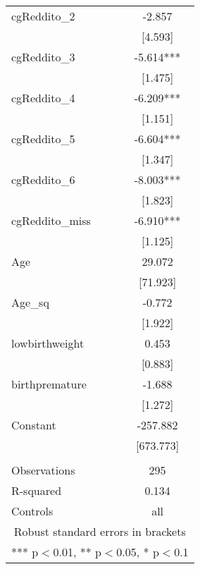 \documentclass[]{article}
\begin{document}
\begin{tabular}{lc}
cgReddito\_2 & -2.857 \\
 & [4.593] \\
cgReddito\_3 & -5.614*** \\
 & [1.475] \\
cgReddito\_4 & -6.209*** \\
 & [1.151] \\
cgReddito\_5 & -6.604*** \\
 & [1.347] \\
cgReddito\_6 & -8.003*** \\
 & [1.823] \\
cgReddito\_miss & -6.910*** \\
 & [1.125] \\
Age & 29.072 \\
 & [71.923] \\
Age\_sq & -0.772 \\
 & [1.922] \\
lowbirthweight & 0.453 \\
 & [0.883] \\
birthpremature & -1.688 \\
 & [1.272] \\
Constant & -257.882 \\
 & [673.773] \\
 &  \\
Observations & 295 \\
R-squared & 0.134 \\
 Controls & all \\ \hline
\multicolumn{2}{c}{ Robust standard errors in brackets} \\
\multicolumn{2}{c}{ *** p$<$0.01, ** p$<$0.05, * p$<$0.1} \\
\end{tabular}
\end{document}
